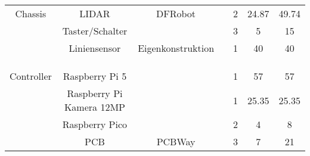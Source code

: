 \documentclass[main.tex]{subfiles} %
\begin{document}
\begin{landscape}
\begin{table}[h]
\begin{tabular}{|c|c|c|c|c|c|c|}
                            &                            &                        &                                    &                     &                            &                                 \\ \hline
        Chassis             & LIDAR                      & DFRobot                &                                    & 2                   & 24.87                      & 49.74                           \\ \hline
                            & Taster/Schalter            &                        &                                    & 3                   & 5                          & 15                              \\ \hline
                            & Liniensensor               & Eigenkonstruktion      &                                    & 1                   & 40                         & 40                              \\ \hline
                            &                            &                        &                                    &                     &                            &                                 \\ \hline
                            &                            &                        &                                    &                     &                            &                                 \\ \hline
                            &                            &                        &                                    &                     &                            &                                 \\ \hline
        Controller          & Raspberry Pi 5             &                        &                                    & 1                   & 57                         & 57                              \\ \hline
                            & Raspberry Pi Kamera 12MP   &                        &                                    & 1                   & 25.35                      & 25.35                           \\ \hline
                            & Raspberry Pico             &                        &                                    & 2                   & 4                          & 8                               \\ \hline
                            & PCB                        & PCBWay                 &                                    & 3                   & 7                          & 21                              \\ \hline

\end{tabular}
\end{table}
\end{landscape}
\end{document}
